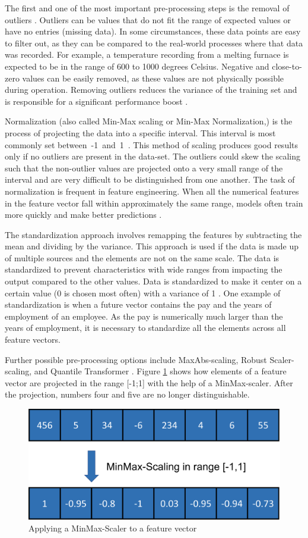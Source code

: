 The first and one of the most important pre-processing steps is the removal of outliers \cite{Yang}. Outliers can be values that do not fit the range of expected values or have no entries (missing data). In some circumstances, these data points are easy to filter out, as they can be compared to the real-world processes where that data was recorded. For example, a temperature recording from a melting furnace is expected to be in the range of 600 to 1000 degrees Celsius. Negative and close-to-zero values can be easily removed, as these values are not physically possible during operation. Removing outliers reduces the variance of the training set and is responsible for a significant performance boost \cite{Li}.

Normalization (also called Min-Max scaling or Min-Max Normalization,) is the process of projecting the data into a specific interval. This interval is most commonly set between~-1~and~1~\cite{Peshawa}. This method of scaling produces good results only if no outliers are present in the data-set. The outliers could skew the scaling such that the non-outlier values are projected onto a very small range of the interval and are very difficult to be distinguished from one another. The task of normalization is frequent in feature engineering. When all the numerical features in the feature vector fall within approximately the same range, models often train more quickly and make better predictions \cite{Jayalakshmi}.

The standardization approach involves remapping the features by subtracting the mean and dividing by the variance. This approach is used if the data is made up of multiple sources and the elements are not on the same scale. The data is standardized to prevent characteristics with wide ranges from impacting the output compared to the other values. Data is standardized to make it center on a certain value (0 is chosen most often) with a variance of 1 \cite{Raju}.
One example of standardization is when a future vector contains the pay and the years of employment of an employee. As the pay is numerically much larger than the years of employment, it is necessary to standardize all the elements across all feature vectors. 

Further possible pre-processing options include MaxAbs-scaling, Robust Scaler-scaling, and Quantile Transformer \cite{Ahsan}.
Figure \ref{fig:MM} shows how elements of a feature vector are projected in the range [-1;1] with the help of a MinMax-scaler. After the projection, numbers four and five are no longer distinguishable. 
\begin{figure}[H]
	\centering
	\includegraphics[width=0.6\linewidth]{IMGs/MM.png}
	\caption{Applying a MinMax-Scaler to a feature vector}
	\label{fig:MM}
\end{figure}


